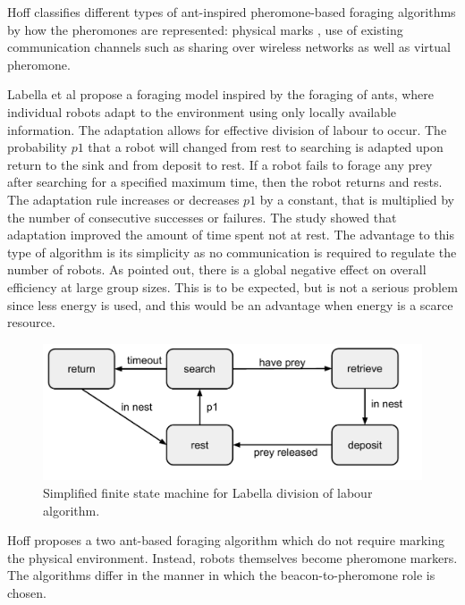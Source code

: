 Hoff \cite{hoff2010two} classifies different types of ant-inspired pheromone-based foraging algorithms by how the pheromones are represented: physical marks \cite{alcoholfromants2012}, use of existing communication channels such as sharing over wireless networks as well as virtual pheromone. %

Labella et al \cite{labella2006division} propose a foraging model inspired by the foraging of ants, where individual robots adapt to the environment using only locally available information. The adaptation allows for effective division of labour to occur. The probability $p1$ that a robot will changed from rest to searching is adapted upon return to the sink and from deposit to rest. If a robot fails to forage any prey after searching for a specified maximum time, then the robot returns and rests. 
The adaptation rule increases or decreases $p1$ by a constant, that is multiplied by the number of consecutive successes or failures. The study showed that adaptation improved the amount of time spent not at rest. The advantage to this type of algorithm is its simplicity as no communication is required to regulate the number of robots. As pointed out, there is a global negative effect on overall efficiency at large group sizes. This is to be expected, but is not a serious problem since less energy is used, and this would be an advantage when energy is a scarce resource. %

\begin{figure}
\includegraphics[width=\textwidth]{chapters/chapter2/figures/LabellaFSM.pdf}
\caption{Simplified finite state machine for Labella division of labour algorithm. }
\end{figure} 

Hoff \cite{hoff2010two} proposes a two ant-based foraging algorithm which do not require marking the physical environment. Instead, robots themselves become pheromone markers. The algorithms differ in the manner in which the beacon-to-pheromone role is chosen. 

